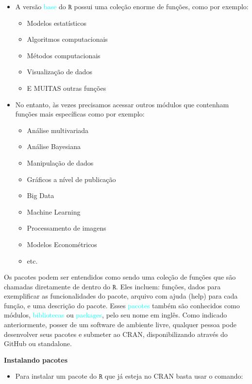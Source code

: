 \documentclass[
]{book}
\providecommand{\tightlist}{%
  \setlength{\itemsep}{0pt}\setlength{\parskip}{0pt}}
\begin{document}
\begin{itemize}
\item
  A versão \textcolor{cyan}{base} do \(\texttt{R}\) possui uma coleção enorme de funções, como por exemplo:

  \begin{itemize}
  \item
    Modelos estatísticos
  \item
    Algoritmos computacionais
  \item
    Métodos computacionais
  \item
    Visualização de dados
  \item
    E MUITAS outras funções
  \end{itemize}
\item
  No entanto, às vezes precisamos acessar outros módulos que contenham funções mais específicas como por exemplo:

  \begin{itemize}
  \item
    Análise multivariada
  \item
    Análise Bayesiana
  \item
    Manipulação de dados
  \item
    Gráficos a nível de publicação
  \item
    Big Data
  \item
    Machine Learning
  \item
    Processamento de imagens
  \item
    Modelos Econométricos
  \item
    etc.
  \end{itemize}
\end{itemize}

Os pacotes podem ser entendidos como sendo uma coleção de funções que são chamadas diretamente de dentro do \(\texttt{R}\). Eles incluem: funções, dados para exemplificar as funcionalidades do pacote, arquivo com ajuda (help) para cada função, e uma descrição do pacote. Esses \textcolor{cyan}{pacotes} também são conhecidos como módulos, \textcolor{cyan}{bibliotecas} ou \textcolor{cyan}{packages}, pelo seu nome em inglês. Como indicado anteriormente, posser de um software de ambiente livre, qualquer pessoa pode desenvolver seus pacotes e submeter ao CRAN, disponibilizando através do GitHub ou standalone.

\textbf{Instalando pacotes}

\begin{itemize}
\tightlist
\item
  Para instalar um pacote do \(\texttt{R}\) que já esteja no CRAN basta usar o comando:
\end{itemize}
\end{document}
